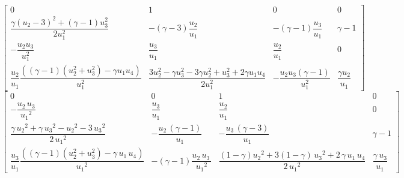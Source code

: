 \documentclass{book}
\begin{document}
\begin{equation}
    \begin{bmatrix}
        0                                                                                                & 1                                                                                                   & 0                                         & 0                           \\
        \dfrac{\gamma (u_{2}-3)^{2}+(\gamma-1) u_{3}^{2}}{2 u_{1}^{2}}                                   & -(\gamma-3)\dfrac{u_{2}}{u_{1}}                                                                     & -(\gamma-1)\dfrac{u_{3}}{u_{1}}           & \gamma-1                    \\
        -\dfrac{u_{2} u_{3}}{u_{1}^{2}}                                                                  & \dfrac{u_{3}}{u_{1}}                                                                                & \dfrac{u_{2}}{u_{1}}                      & 0                           \\
        \dfrac{u_{2}}{u_1}\dfrac{\left((\gamma-1)(u_{2}^{2}+u_3^2)-\gamma u_{1} u_{4}\right)}{u_{1}^{2}} & \dfrac{3 u_{2}^{2}-\gamma u_{3}^{2}-3 \gamma u_{2}^{2}+u_{3}^{2}+2 \gamma u_{1} u_{4}}{2 u_{1}^{2}} & -\dfrac{u_{2} u_{3}(\gamma-1)}{u_{1}^{2}} & \dfrac{\gamma u_{2}}{u_{1}}
    \end{bmatrix}
\end{equation}
\begin{equation}
    \begin{bmatrix}
        0                                                                                             & 0                                                        & 1                                                                                       & 0                           \\
        -\dfrac{u_2 \,u_3 }{{u_1 }^2 }                                                                & \dfrac{u_3 }{u_1 }                                       & \dfrac{u_2 }{u_1 }                                                                      & 0                           \\
        \dfrac{\gamma \,{u_2 }^2 +\gamma \,{u_3 }^2 -{u_2 }^2 -3\,{u_3 }^2 }{2\,{u_1 }^2 }            & -\dfrac{u_2 \,{\left(\gamma -1\right)}}{u_1 }            & -\dfrac{u_3 \,{\left(\gamma -3\right)}}{u_1 }                                           & \gamma -1                   \\
        \dfrac{u_3}{u_1}\dfrac{{\left((\gamma-1)(u_2^2+u_3^2)-\gamma \,u_1 \,u_4 \right)}}{{u_1 }^2 } & -{\left(\gamma -1\right)}\dfrac{u_2 \,u_3 \,}{{u_1 }^2 } & \dfrac{(1-\gamma){u_2 }^2 +3(1-\gamma)\,{u_3 }^2 +2\,\gamma \,u_1 \,u_4 }{2\,{u_1 }^2 } & \dfrac{\gamma \,u_3 }{u_1 }
    \end{bmatrix}
\end{equation}
\end{document}
